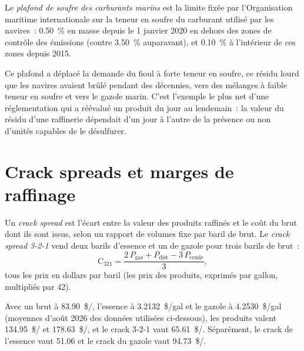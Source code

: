 \begin{definition}\label{def:m3:refined-products-and-cracks:imo}
Le \emph{plafond de soufre des carburants marins} est la
limite fixée par l'Organisation maritime internationale sur la teneur en soufre du carburant utilisé par
les navires~: 0.50~\% en masse depuis le 1 janvier 2020 en dehors des zones de contrôle des émissions (contre
3.50~\% auparavant), et 0.10~\% à l'intérieur de ces zones depuis 2015.
\end{definition}

Ce plafond a déplacé la demande du fioul à forte teneur en soufre, ce résidu lourd que les navires avaient
brûlé pendant des décennies, vers des mélanges à faible teneur en soufre et vers le gazole marin. C'est
l'exemple le plus net d'une réglementation qui a réévalué un produit du jour au lendemain~: la valeur
du résidu d'une raffinerie dépendait d'un jour à l'autre de la présence ou non d'unités
capables de le désulfurer.

\section{Crack spreads et marges de raffinage}

\begin{definition}\label{def:m3:refined-products-and-cracks:crack}
Un \emph{crack spread} est l'écart entre la valeur des
produits raffinés et le coût du brut dont ils sont issus, selon un rapport de volumes fixe
par baril de brut. Le \emph{crack spread 3-2-1}
vend deux barils d'essence et un de gazole pour trois barils de brut~:
\[
\mathrm{C}_{321} = \frac{2\,P_{\mathrm{gas}} + P_{\mathrm{dist}} - 3\,P_{\mathrm{crude}}}{3},
\]
tous les prix en dollars par baril (les prix des produits, exprimés par gallon, multipliés par 42).
\end{definition}

\begin{example}\label{ex:m3:refined-products-and-cracks:crack}
Avec un brut à \qty{83.90}{\$/\barrel}, l'essence à \qty{3.2132}{\$/gal} et le gazole à
\qty{4.2530}{\$/gal} (moyennes d'août 2026 des données utilisées ci-dessous), les produits
valent \qty{134.95}{\$/\barrel} et \qty{178.63}{\$/\barrel}, et le crack 3-2-1 vaut
\qty{65.61}{\$/\barrel}. Séparément, le crack de l'essence vaut \qty{51.06}{} et le crack du gazole
vaut \qty{94.73}{\$/\barrel}.
\end{example}

